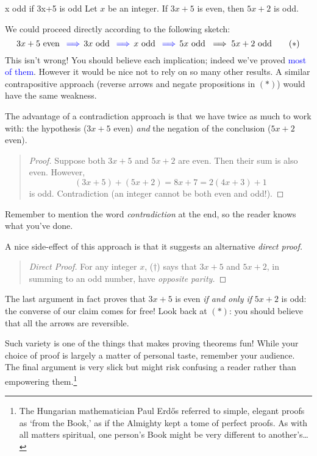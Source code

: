 \begin{example}{}{x odd if 3x+5 is odd}
	Let $x$ be an integer. If $3x+5$ is even, then $5x+2$ is odd.\medbreak

	We could proceed directly according to the following sketch:
	\[
		3x+5\text{ even }\operatorname{\textcolor{blue}{\implies}} 3x\text{ odd }\operatorname{\textcolor{blue}{\implies}} x\text{ odd }\operatorname{\textcolor{blue}{\implies}} 5x\text{ odd }\implies 5x+2\text{ odd} \tag{$\ast$}
	\]
	This isn't wrong! You should believe each implication; indeed we've proved \textcolor{blue}{most of them}. However it would be nice not to rely on so many other results. A similar contrapositive approach (reverse arrows and negate propositions in $(\ast)$) would have the same weakness.\medbreak
	
	The advantage of a contradiction approach is that we have twice as much to work with: the hypothesis ($3x+5$ even) \emph{and} the negation of the conclusion ($5x+2$ even).
	
	\begin{quote}
		\begin{proof}
			Suppose both $3x+5$ and $5x+2$ are even. Then their sum is also even. However,
		  \[
		  	(3x+5)+(5x+2)=8x+7=2(4x+3)+1 \tag{$\dag$}
		  \]
		  is odd. Contradiction (an integer cannot be both even and odd!).
		\end{proof}
	\end{quote}
	
	Remember to mention the word \emph{contradiction} at the end, so the reader knows what you've done.\smallbreak
	
	A nice side-effect of this approach is that it suggests an alternative \emph{direct proof.}
	
	\begin{quote}
		\begin{proof}[Direct Proof]
			For any integer $x$, ($\dag$) says that $3x+5$ and $5x+2$, in summing to an odd number, have \emph{opposite parity.}
		\end{proof}
	\end{quote}
	
	The last argument in fact proves that $3x+5$ is even \emph{if and only if} $5x+2$ is odd: the converse of our claim comes for free! Look back at $(\ast)$: you should believe that all the arrows are reversible.
\end{example}

\goodbreak

Such variety is one of the things that makes proving theorems fun! While your choice of proof is largely a matter of personal taste, remember your audience. The final argument is very slick but might risk confusing a  reader rather than empowering them.\footnote{The Hungarian mathematician Paul Erdős referred to simple, elegant proofs as `from the Book,' as if the  Almighty kept a tome of perfect proofs. As with all matters spiritual, one person's Book might be very different to another's\ldots} 


